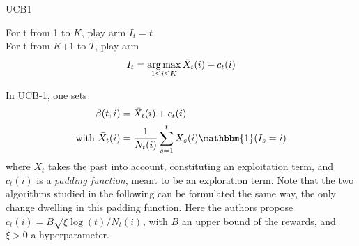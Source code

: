 \begin{algorithm}
    \caption{UCB1}
	\label{alg:ucb1}
    For t from 1 to $K$, play arm $I_t = t$ \\
    For t from $K$+1 to $T$, play arm 
    $$ I_t = \operatorname*{arg\,max}_{1\leq i \leq K} \bar X_t(i) + c_t(i)$$
\end{algorithm}


In UCB-1, one sets 
\begin{align}
\beta(t,i)& =\bar{X}_t(i)+c_t(i)\\
\text{with } \bar{X}_t(i) &= \frac{1}{N_t(i)}\sum_{s=1}^t X_s(i)\mathbbm{1}(I_s=i)
\end{align}
where $\bar{X}_t$ takes the past into account, constituting an exploitation term, and $c_t(i)$ is a \textit{padding function}, meant to be an exploration term. Note that the two algorithms studied in the following can be formulated the same way, the only change dwelling in this padding function. Here the authors propose $c_t(i)=B\sqrt{\xi \log(t)/N_t(i)}$, with $B$ an upper bound of the rewards, and $\xi>0$ a hyperparameter.

